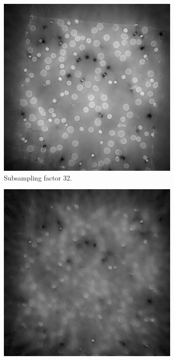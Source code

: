 \begin{figure}
  \begin{subfigure}[t]{.45\textwidth}
    \centering
    \includegraphics[width=\linewidth]{figures/ns32it100000itd4mse035logcosh3.png}
    \caption{Subsampling factor 32. }
  \end{subfigure}
  \hfill
  \begin{subfigure}[t]{.45\textwidth}
    \centering
    \includegraphics[width=\linewidth]{figures/ns48it100000itd4mse035logcosh3.png}

\end{subfigure}
\end{figure}
